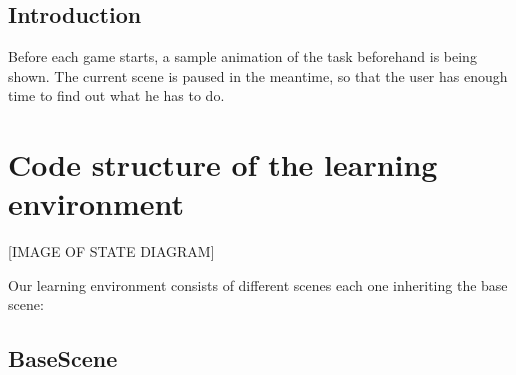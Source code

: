 \subsection{Introduction}
Before each game starts, a sample animation of the task beforehand is being shown.
The current scene is paused in the meantime, so that the user has enough time to find out what he has to do.

\section{Code structure of the learning environment}
[IMAGE OF STATE DIAGRAM]

Our learning environment consists of different scenes each one inheriting the base scene:
\subsection{BaseScene}


